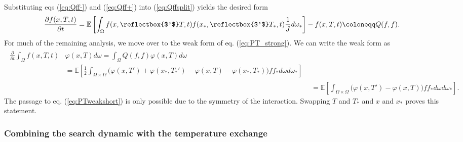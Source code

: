\documentclass[10pt,a4paper]{article}
\theoremstyle{theorem}
\newcommand{\lp}{\reflectbox{$'$}}
\numberwithin{equation}{section}
\begin{document}
Substituting eqs (\ref{eq:Qff-}) and (\ref{eq:Qff+}) into (\ref{eq:Qffsplit}) yields the desired form
\begin{equation}
\label{eq:PT_strong}
\frac{\partial f(x,T,t)}{\partial t}=\mathbb{E}\left[\int_\Omega f(x,\lp T,t)f(x_*,\lp T_*,t)\frac{1}{J} d\omega_*\right]-f(x,T,t)\coloneqq Q(f,f).
\end{equation}
For much of the remaining analysis, we move over to the weak form of eq. (\ref{eq:PT_strong}). We can write the weak form as
\begin{align}
\begin{split}
\label{eq:PTweaklong}
\frac{\partial}{\partial t}\int_{\Omega} f(x,T,t)&\varphi(x,T)d\omega=\int_{\Omega}Q(f,f)\varphi(x,T)d\omega\\
&=\mathbb{E}\left[\frac{1}{2}\int_{\Omega\times\Omega}\big(\varphi(x,T')+\varphi(x_*,T_*')-\varphi(x,T)-\varphi(x_*,T_*)\big) ff_*d\omega d\omega_*\right]
\end{split}\\
\label{eq:PTweakshort}
&=\mathbb{E}\left[\int_{\Omega\times\Omega}\big(\varphi(x,T')-\varphi(x,T)\big) ff_*d\omega d\omega_*\right].
\end{align}
The passage to eq. (\ref{eq:PTweakshort}) is only possible due to the symmetry of the interaction. Swapping $T$ and $T_*$ and $x$ and $x_*$ proves this statement.




\subsubsection{Combining the search dynamic with the temperature exchange}
\label{subsec:population_Lf_Qff}
\end{document}
